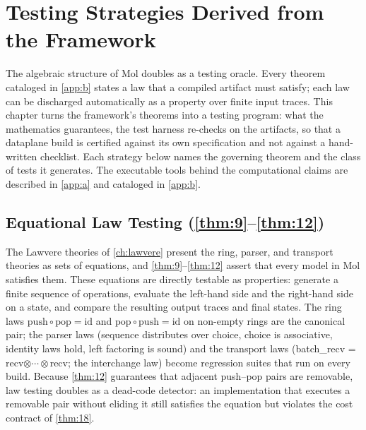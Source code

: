 \chapter{Testing Strategies Derived from the Framework}\label{ch:testing}

The algebraic structure of Mol doubles as a testing oracle. Every theorem cataloged in \autoref{app:b} states a law that a compiled artifact must satisfy; each law can be discharged automatically as a property over finite input traces. This chapter turns the framework's theorems into a testing program: what the mathematics guarantees, the test harness re-checks on the artifacts, so that a dataplane build is certified against its own specification and not against a hand-written checklist. Each strategy below names the governing theorem and the class of tests it generates. The executable tools behind the computational claims are described in \autoref{app:a} and cataloged in \autoref{app:b}.

\section{Equational Law Testing (\autoref{thm:9}--\autoref{thm:12})}
The Lawvere theories of \autoref{ch:lawvere} present the ring, parser, and transport theories as sets of equations, and \ref{thm:9}--\ref{thm:12} assert that every model in Mol satisfies them. These equations are directly testable as properties: generate a finite sequence of operations, evaluate the left-hand side and the right-hand side on a state, and compare the resulting output traces and final states. The ring laws $\mathrm{push}\circ\mathrm{pop} = \mathrm{id}$ and $\mathrm{pop}\circ\mathrm{push} = \mathrm{id}$ on non-empty rings are the canonical pair; the parser laws (sequence distributes over choice, choice is associative, identity laws hold, left factoring is sound) and the transport laws (batch\_recv = recv$\otimes\cdots\otimes$recv; the interchange law) become regression suites that run on every build. Because \ref{thm:12} guarantees that adjacent push--pop pairs are removable, law testing doubles as a dead-code detector: an implementation that executes a removable pair without eliding it still satisfies the equation but violates the cost contract of \ref{thm:18}.

